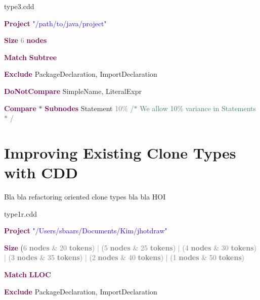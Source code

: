 \documentclass[sigplan,10pt,review,anonymous]{acmart}
\begin{document}
\noindent\makebox[\linewidth]{\rule{\linewidth}{0.4pt}}
\noindent type3.cdd\par
\noindent\makebox[\linewidth]{\rule{\linewidth}{0.4pt}}
\noindent \textbf{\textcolor[HTML]{7F0055}{Project}} \textcolor[HTML]{2A00FF}{"/path/to/java/project"}\par
\noindent \textbf{\textcolor[HTML]{7F0055}{Size}} \textcolor[HTML]{7D7D7D}{6} \textbf{\textcolor[HTML]{7F0055}{nodes}}\par
\noindent \textbf{\textcolor[HTML]{7F0055}{Match}} \textbf{\textcolor[HTML]{7F0055}{Subtree}}\par
\noindent \textbf{\textcolor[HTML]{7F0055}{Exclude}} PackageDeclaration, ImportDeclaration\par
\noindent \textbf{\textcolor[HTML]{7F0055}{DoNotCompare}} SimpleName, LiteralExpr\par
\noindent\textbf{\textcolor[HTML]{7F0055}{Compare}} $\ast$  \textbf{\textcolor[HTML]{7F0055}{Subnodes}} Statement \textcolor[HTML]{7D7D7D}{10$\%$}  \textcolor[HTML]{3F7F5F}{/$\ast$  We allow 10$\%$  variance in Statements $\ast$ /}\par
\noindent\makebox[\linewidth]{\rule{\linewidth}{0.4pt}}

\section{Improving Existing Clone Types with CDD}
Bla bla refactoring oriented clone types bla bla HOI

\vspace{\baselineskip}
type1r.cdd\par

\textbf{\textcolor[HTML]{7F0055}{Project}} \textcolor[HTML]{2A00FF}{"/Users/sbaars/Documents/Kim/jhotdraw"}\par

\textbf{\textcolor[HTML]{7F0055}{Size}} (\textcolor[HTML]{7D7D7D}{6 \textbf{nodes} $\&$  20 \textbf{tokens}) $ \vert $  (5 \textbf{nodes} $\&$  25 \textbf{tokens}) $ \vert $  (4 \textbf{nodes} $\&$  30 \textbf{tokens}) $ \vert $  (3 \textbf{nodes} $\&$  35 \textbf{tokens}) $ \vert $  (2 \textbf{nodes} $\&$  40 \textbf{tokens}) $ \vert $  (1 \textbf{nodes} $\&$  50 \textbf{tokens})}\par

\textbf{\textcolor[HTML]{7F0055}{Match}} \textbf{\textcolor[HTML]{7F0055}{LLOC}}\par

\textbf{\textcolor[HTML]{7F0055}{Exclude}} PackageDeclaration, ImportDeclaration\par
\end{document}
